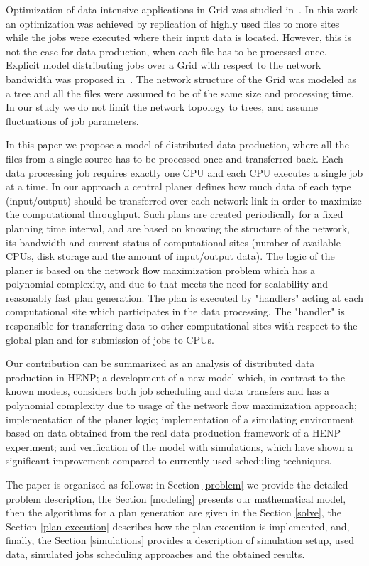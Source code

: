 \documentclass{svjour3}                     %
\begin{document}
Optimization of data intensive applications in Grid was studied
in~\cite{Globus_scheduler}. In this work an optimization was achieved by
replication of highly used files to more sites while the jobs were executed
where their input data is located. However, this is not the case for data
production, when each file has to be processed once. 
%
Explicit model distributing jobs over a Grid with respect to the network
bandwidth was proposed in~\cite{Trees}. The network structure of the Grid was
modeled as a tree and all the files were assumed to be of the same size and
processing time. In our study we do not limit the network topology to trees,
and assume fluctuations of job parameters. 

In this paper we propose a model of distributed data production, where all the files from a single source has to be processed once and transferred back. Each data processing job requires exactly one CPU and each CPU executes a single job at a time. In our approach a central planer defines how much data of each type (input/output) should be transferred over each network link in order to maximize the computational throughput. Such plans are created periodically for a fixed planning time interval, and are based on knowing the structure of the network, its bandwidth and current status of computational sites (number of available CPUs, disk storage and the amount of input/output data). The logic of the planer is based on the network flow maximization problem which has a polynomial complexity, and due to that meets the need for scalability and reasonably fast plan generation. The plan is executed by "handlers" acting at each computational site which participates in the data processing. The "handler" is responsible for transferring data to other computational sites with respect to the global plan and for submission of jobs to CPUs. 
 
Our contribution can be summarized as an analysis of distributed data production in HENP; a development of a new model which, in contrast to the known models, considers both job scheduling and data transfers and has a polynomial complexity due to usage of the network flow maximization approach; implementation of the planer logic; implementation of a simulating environment based on data obtained from the real data production framework of a HENP experiment; and verification of the model with simulations, which have shown a significant improvement compared to currently used scheduling techniques. 

The paper is organized as follows: in Section \ref{problem} we provide the detailed problem description, the Section \ref{modeling} presents our mathematical model, then the algorithms for a plan generation are given in the Section \ref{solve}, the Section \ref{plan-execution} describes how the plan execution is implemented, and, finally, the Section \ref{simulations} provides a description of simulation setup, used data, simulated jobs scheduling approaches and the obtained results. 
\end{document}

